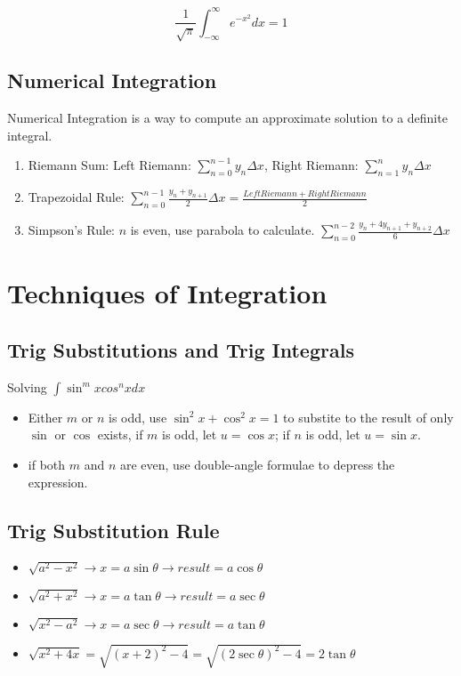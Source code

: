 \documentclass{article}
\newcommand\defint[3]{\int_{#1}^{#2}#3dx}
\begin{document}
$$\frac{1}{\sqrt{\pi}}\defint{-\infty}{\infty}{e^{-x^2}} = 1$$

\subsection{Numerical Integration}
Numerical Integration is a way to compute an approximate solution to a definite integral.
\begin{enumerate}
  \item Riemann Sum: Left Riemann: $\sum\limits_{n=0}^{n-1}y_n\Delta x$, Right Riemann: $\sum\limits_{n=1}^{n}y_n\Delta x$
  \item Trapezoidal Rule: $\sum\limits_{n=0}^{n-1}\frac{y_n+y_{n+1}}{2}\Delta x = \frac{Left Riemann+ Right Riemann}{2}$
  \item Simpson’s Rule: $n$ is even, use parabola to calculate. $\sum\limits_{n=0}^{n-2}\frac{y_n+4y_{n+1}+y_{n+2}}{6}\Delta x$
\end{enumerate}

\section{Techniques of Integration}
\subsection{Trig Substitutions and Trig Integrals}

Solving $\int\sin^mxcos^nxdx$

\begin{itemize}
  \item Either $m$ or $n$ is odd, use $\sin^2x + \cos^2x = 1$ to substite to the result of only $\sin$ or $\cos$ exists, if $m$ is odd, let $u = \cos x$; if $n$ is odd, let $u = \sin x$.
  \item if both $m$ and $n$ are even, use double-angle formulae to depress the expression.
\end{itemize}

\subsection{Trig Substitution Rule}
\begin{itemize}
  \item $\sqrt{a^2-x^2} \rightarrow x = a\sin \theta \rightarrow result = a\cos \theta$
  \item $\sqrt{a^2+x^2} \rightarrow x = a\tan \theta \rightarrow result = a\sec \theta$
  \item $\sqrt{x^2-a^2} \rightarrow x = a\sec \theta \rightarrow result = a\tan \theta$
  \item $\sqrt{x^2+4x} = \sqrt{(x+2)^2-4} = \sqrt{(2\sec \theta)^2-4} = 2\tan \theta$
\end{itemize}
\end{document}
